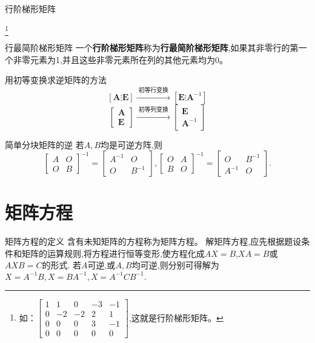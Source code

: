 \documentclass[8pt a4paper,oneside,UTF8]{ctexbook}
\begin{document}
\begin{sloppypar}
\begin{defn}{行阶梯形矩阵}{}
\begin{enumerate}
        \end{enumerate}\footnote{如：$\begin{bmatrix} 1 & 1 & 0 & -3 & -1 \\ 0 & -2 & -2 & 2 & 1\\ 0 & 0 & 0 & 3 & -1 \\  0 & 0 & 0 & 0 & 0  \end{bmatrix}$,这就是行阶梯形矩阵。}
    \end{defn}
    \begin{defn}{行最简阶梯形矩阵}{}
        一个\textbf{行阶梯形矩阵}称为\textbf{行最简阶梯形矩阵},如果其非零行的第一个非零元素为1,并且这些非零元素所在列的其他元素均为0。
    \end{defn}
    \begin{criterion}{用初等变换求逆矩阵的方法}{}
        $$[\boldsymbol{A} \vdots \boldsymbol{E}] \xrightarrow{\text { 初等行变换 }}\left[\boldsymbol{E} \vdots \boldsymbol{A}^{-1}\right]$$
        $$\left[\begin{array}{l}\boldsymbol{A} \\ \boldsymbol{E}\end{array}\right] \xrightarrow{\text { 初等列变换 }}\left[\begin{array}{c}\boldsymbol{E} \\ \boldsymbol{A}^{-1}\end{array}\right]$$
    \end{criterion}
    \begin{criterion}{简单分块矩阵的逆}{}
        若$A,B$均是可逆方阵,则
        $$
            \begin{bmatrix}A&O\\O&B\end{bmatrix}^{-1}=\begin{bmatrix}A^{-1}&O\\O&B^{-1}\end{bmatrix},\begin{bmatrix}O&A\\B&O\end{bmatrix}^{-1}=\begin{bmatrix}O&B^{-1}\\A^{-1}&O\end{bmatrix}.
        $$
    \end{criterion}
    \section{矩阵方程}
    \begin{defn}{矩阵方程的定义}{}
        含有未知矩阵的方程称为矩阵方程。\newline
        解矩阵方程,应先根据题设条件和矩阵的运算规则,将方程进行恒等变形,使方程化成$AX=B$,$XA=B$或$AXB=C$的形式.\newline
        若$A$可逆,或$A,B$均可逆,则分别可得解为$X=A^{-1} B,X=BA^{-1},X=A^{-1}CB^{-1}.$
    \end{defn}

\end{sloppypar}
\end{document}
